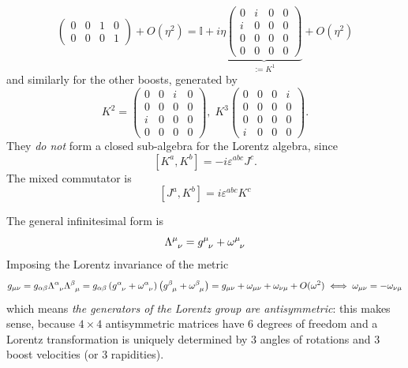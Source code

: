 \begin{enumerate}
\[\begin{pmatrix}
        0&0&1&0\\
        0&0&0&1
    \end{pmatrix} + O(\eta^2) =\mathbb{I}+i\eta\underbrace{\begin{pmatrix}
        0&i&0&0\\
        i&0&0&0\\
        0&0&0&0\\
        0&0&0&0
    \end{pmatrix}}_{:=K^1} + O(\eta^2)
\]
and similarly for the other boosts, generated by
\[
    K^2 = \begin{pmatrix}
        0&0&i&0\\
        0&0&0&0\\
        i&0&0&0\\
        0&0&0&0
    \end{pmatrix},\; K^3\begin{pmatrix}
        0&0&0&i\\
        0&0&0&0\\
        0&0&0&0\\
        i&0&0&0
    \end{pmatrix}. 
\]
They \textit{do not} form a closed sub-algebra for the Lorentz algebra, since
\[
    \left[K^a,K^b\right] = -i\varepsilon^{abc}J^c.
\]
The mixed commutator is
\[
    \left[J^a,K^b\right] = i\varepsilon^{abc}K^c
\]
\end{enumerate}
The general infinitesimal form is
\[
    \Lambda\indices{^\mu_\nu} = g\indices{^\mu_\nu}+\omega\indices{^\mu_\nu}
\]
Imposing the Lorentz invariance of the metric
\[
    g_{\mu\nu} = g_{\alpha\beta}\Lambda\indices{^\alpha_\nu}\Lambda\indices{^\beta
    _\mu} = g_{\alpha\beta}\left(g\indices{^\alpha_\nu}+\omega\indices{^\alpha_\nu
    }\right)\left(g\indices{^\beta_\mu}+\omega\indices{^\beta_\mu
    }\right) = g_{\mu\nu} +\omega_{\mu\nu}+\omega_{\nu\mu} + O(\omega^2)\iff 
    \omega_{\mu\nu}=-\omega_{\nu\mu}
\]
which means \textit{the generators of the Lorentz group are antisymmetric}:
this makes sense, because $4\times4$ antisymmetric matrices have $6$ degrees of
freedom and a Lorentz transformation is uniquely determined by $3$ angles of
rotations and $3$ boost velocities (or $3$ rapidities).

